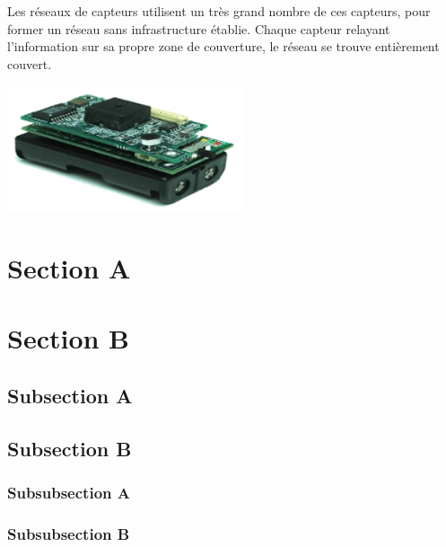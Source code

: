 Les réseaux de capteurs utilisent un très grand nombre de ces capteurs, pour former un réseau sans infrastructure établie. Chaque capteur relayant l'information sur sa propre zone de couverture, le réseau se trouve entièrement couvert.

\begin{center}
\includegraphics[width=7cm,height=3.7cm]{Chap1/chap1.png}
\end{center}


\section{Section A}
\section{Section B}
\subsection{Subsection A}
\subsection{Subsection B}
\subsubsection{Subsubsection A}
\subsubsection{Subsubsection B}
